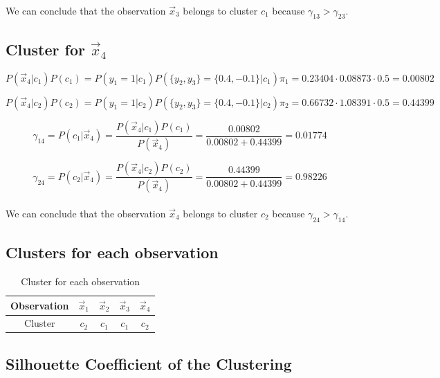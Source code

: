 \documentclass{article}
\begin{document}
\paragraph{} We can conclude that the observation $\vec{x}_3$ belongs to cluster $c_1$ because $\gamma_{13} > \gamma_{23}$.

\subsection*{Cluster for $\vec{x}_4$}

\[ P(\vec{x}_4 | c_1) P(c_1) = P(y_1 = 1 | c_1) P(\{y_2, y_3\}  = \{0.4, -0.1\} | c_1) \pi_1 = 0.23404 \cdot 0.08873 \cdot 0.5 = 0.00802 \]

\[ P(\vec{x}_4 | c_2) P(c_2) = P(y_1 = 1 | c_2) P(\{y_2, y_3\}  = \{0.4, -0.1\} | c_2) \pi_2 = 0.66732 \cdot 1.08391 \cdot 0.5 = 0.44399 \]

\[ \gamma_{14} = P(c_1| \vec{x}_4) = \frac{P(\vec{x}_4 | c_1) P(c_1)}{P(\vec{x}_4)} = \frac{0.00802}{0.00802 + 0.44399} = 0.01774 \]

\[ \gamma_{24} = P(c_2| \vec{x}_4) = \frac{P(\vec{x}_4 | c_2) P(c_2)}{P(\vec{x}_4)} = \frac{0.44399}{0.00802 + 0.44399} = 0.98226 \]

\paragraph{} We can conclude that the observation $\vec{x}_4$ belongs to cluster $c_2$ because $\gamma_{24} > \gamma_{14}$.

\subsection*{Clusters for each observation}

\begin{table}[h!]
  \centering
  \begin{tabular}{c|c|c|c|c}
    Observation & $\vec{x}_1$ & $\vec{x}_2$ & $\vec{x}_3$ & $\vec{x}_4$ \\ \hline
    Cluster & $c_2$ & $c_1$ & $c_1$ & $c_2$ \\ 
  \end{tabular}
  \caption{Cluster for each observation}
  \label{tab:clusters}
\end{table}

\subsection*{Silhouette Coefficient of the Clustering}
\end{document}
